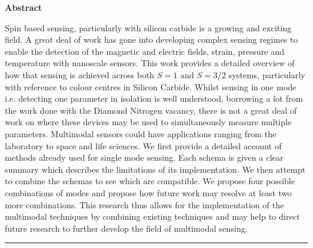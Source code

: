 \vspace*{\fill}
\begin{center}
\textrm{\bfseries\Huge Abstract}%
\end{center}%
Spin based sensing, particularly with silicon carbide is a growing and exciting field. A great deal of work has gone into developing complex sensing regimes to enable the detection of the magnetic and electric fields, strain, pressure and temperature with nanoscale sensors. 
This work provides a detailed overview of how that sensing is achieved across both $S=1$ and $S=3/2$ systems, particularly with reference to colour centres in Silicon Carbide. 
Whilst sensing in one mode i.e. detecting one parameter in isolation is well understood, borrowing a lot from the work done with the Diamond Nitrogen vacancy, there is not a great deal of work on where these devices may be used to simultaneously measure multiple parameters. 
Multimodal sensors could have applications ranging from the laboratory to space and life sciences. We first provide a detailed account of methods already used for single mode sensing. Each schema is given a clear summary which describes the limitations of its implementation. We then attempt to combine the schemas to see which are compatible.%
We propose four possible combinations of modes and propose how future work may resolve at least two more combinations. This research thus allows for the implementation of the multimodal techniques by combining existing techniques and may help to direct future research to further develop the field of multimodal sensing. 
\vspace{1em}
\begin{center}
    {\color{figcaption}\rule{0.75\textwidth}{0.1pt}}
\end{center}
